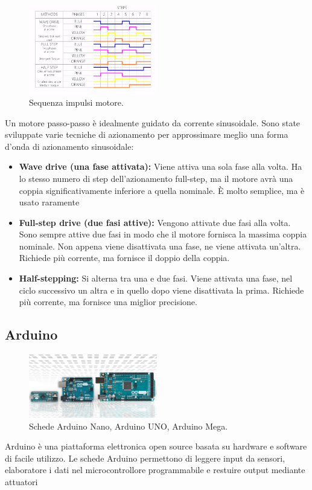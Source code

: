 \documentclass[12pt,oneside,a4paper]{article}
\begin{document}
\begin{figure}[ht!]
    \centering
    \includegraphics[width=0.5\textwidth]{figures/motor-sequence.png}
    \caption{Sequenza impulsi motore.}
\end{figure}
Un motore passo-passo è idealmente guidato da corrente sinusoidale. Sono state sviluppate varie tecniche di azionamento per approssimare meglio una forma d'onda di azionamento sinusoidale:
\begin{itemize}
    \item \textbf{Wave drive (una fase attivata): } Viene attiva una sola fase alla volta. Ha lo stesso numero di step dell'azionamento full-step, ma il motore avrà una coppia significativamente inferiore a quella nominale. È molto semplice, ma è usato raramente
    \item \textbf{Full-step drive (due fasi attive): } Vengono attivate due fasi alla volta. Sono sempre attive due fasi in modo che il motore fornisca la massima coppia nominale. Non appena viene disattivata una fase, ne viene attivata un'altra. Richiede più corrente, ma fornisce il doppio della coppia.
    \item \textbf{Half-stepping: } Si alterna tra una e due fasi. Viene attivata una fase, nel ciclo successivo un altra e in quello dopo viene disattivata la prima.  Richiede più corrente, ma fornisce una miglior precisione.
\end{itemize}


\subsection{Arduino}
\begin{figure}[ht!]
    \centering
    \includegraphics[width=0.5\textwidth]{figures/arduino.png}
    \caption{Schede Arduino Nano, Arduino UNO, Arduino Mega.}
\end{figure}
Arduino\cite{Arduino} è una piattaforma elettronica open source basata su hardware e software di facile utilizzo. Le schede Arduino permettono di leggere input da sensori, elaboratore i dati nel microcontrollore programmabile e restuire output mediante attuatori
\end{document}
